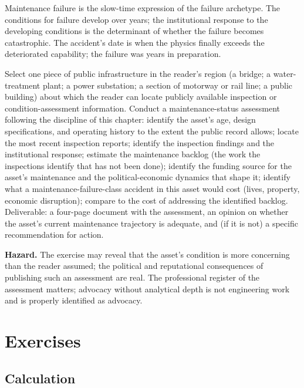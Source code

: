 \begin{archetype}[failure]
Maintenance failure is the slow-time expression of the failure archetype. The conditions for failure develop over years; the institutional response to the developing conditions is the determinant of whether the failure becomes catastrophic. The accident's date is when the physics finally exceeds the deteriorated capability; the failure was years in preparation.
\end{archetype}

\begin{project}
Select one piece of public infrastructure in the reader's region (a bridge; a water-treatment plant; a power substation; a section of motorway or rail line; a public building) about which the reader can locate publicly available inspection or condition-assessment information. Conduct a maintenance-status assessment following the discipline of this chapter: identify the asset's age, design specifications, and operating history to the extent the public record allows; locate the most recent inspection reports; identify the inspection findings and the institutional response; estimate the maintenance backlog (the work the inspections identify that has not been done); identify the funding source for the asset's maintenance and the political-economic dynamics that shape it; identify what a maintenance-failure-class accident in this asset would cost (lives, property, economic disruption); compare to the cost of addressing the identified backlog. Deliverable: a four-page document with the assessment, an opinion on whether the asset's current maintenance trajectory is adequate, and (if it is not) a specific recommendation for action.

\textbf{Hazard.} The exercise may reveal that the asset's condition is more concerning than the reader assumed; the political and reputational consequences of publishing such an assessment are real. The professional register of the assessment matters; advocacy without analytical depth is not engineering work and is properly identified as advocacy.
\end{project}

\section{Exercises}

\subsection*{Calculation}

